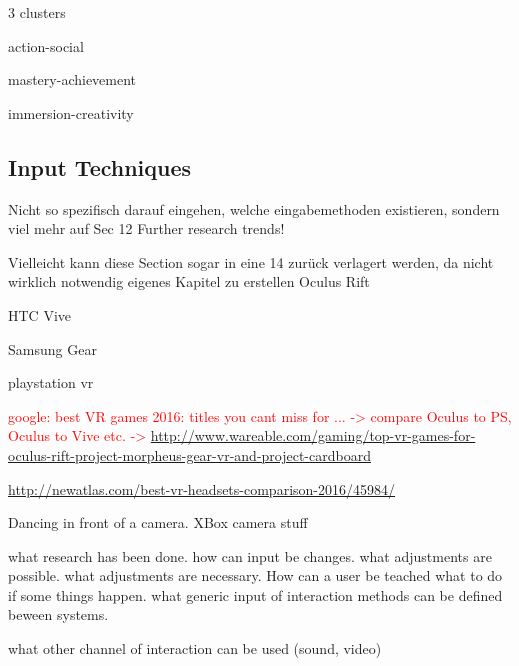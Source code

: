 3 clusters 

action-social

mastery-achievement

immersion-creativity

\subsection{Input Techniques}
Nicht so spezifisch darauf eingehen, welche eingabemethoden existieren, sondern viel mehr auf Sec 12 Further research trends!

Vielleicht kann diese Section sogar in eine 14 zurück verlagert werden, da nicht wirklich notwendig eigenes Kapitel zu erstellen 
Oculus Rift

HTC Vive

Samsung Gear

playstation vr

\textcolor{red}{google: best VR games 2016: titles you cant miss for ... -> compare Oculus to PS, Oculus to Vive etc. -> \url{http://www.wareable.com/gaming/top-vr-games-for-oculus-rift-project-morpheus-gear-vr-and-project-cardboard}}

\url{http://newatlas.com/best-vr-headsets-comparison-2016/45984/}

Dancing in front of a camera. XBox camera stuff

what research has been done. how can input be changes. what adjustments are possible. what adjustments are necessary. How can a user be teached what to do if some things happen. what generic input of interaction methods can be defined beween systems.

what other channel of interaction can be used (sound, video)
